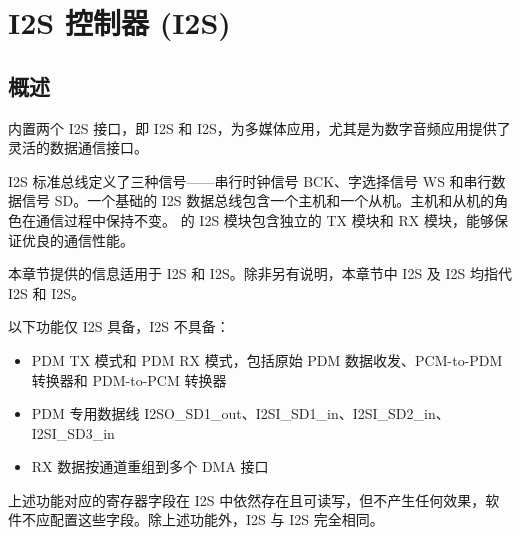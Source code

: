 \documentclass[main\_\_CN.tex]{subfiles}
\begin{document}
\setchineseformatting


\ifglobal
\else
    \clearpage
    \listoftodos
    \listofdonetodos
    \tableofcontents
\fi



\hypertarget{i2s}{}
\chapter{I2S 控制器 (I2S)}
\label{mod:i2s}

\section{概述}
\label{sec:i2s-overview}

\chipname{} 内置两个 I2S 接口，即 I2S 和 I2S，为多媒体应用，尤其是为数字音频应用提供了灵活的数据通信接口。

I2S 标准总线定义了三种信号——串行时钟信号 BCK、字选择信号 WS 和串行数据信号 SD。一个基础的 I2S 数据总线包含一个主机和一个从机。主机和从机的角色在通信过程中保持不变。\chipname{} 的 I2S 模块包含独立的 TX 模块和 RX 模块，能够保证优良的通信性能。

\begin{tiplisting}
本章节提供的信息适用于 I2S 和 I2S。除非另有说明，本章节中 I2S 及 I2S 均指代 I2S 和 I2S。

以下功能仅 I2S 具备，I2S 不具备：
\begin{itemize}
    \item PDM TX 模式和 PDM RX 模式，包括原始 PDM 数据收发、PCM-to-PDM 转换器和 PDM-to-PCM 转换器
    \item PDM 专用数据线 I2SO\_SD1\_out、I2SI\_SD1\_in、I2SI\_SD2\_in、I2SI\_SD3\_in
    \item RX 数据按通道重组到多个 DMA 接口
\end{itemize}
上述功能对应的寄存器字段在 I2S 中依然存在且可读写，但不产生任何效果，软件不应配置这些字段。除上述功能外，I2S 与 I2S 完全相同。
\end{tiplisting}
\end{document}
